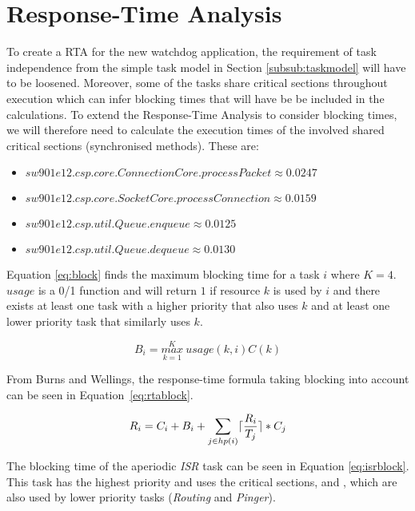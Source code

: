 \section{Response-Time Analysis}
To create a RTA for the new watchdog application, the requirement of task independence from the simple task model in Section \ref{subsub:taskmodel} will have to be loosened. Moreover, some of the tasks share critical sections throughout execution which can infer blocking times that will have be be included in the calculations. To extend the Response-Time Analysis to consider blocking times, we will therefore need to calculate the execution times of the involved shared critical sections (synchronised methods). These are:

\begin{itemize}
	\item $ sw901e12.csp.core.ConnectionCore.processPacket \approx 0.0247$
	\item $ sw901e12.csp.core.SocketCore.processConnection \approx 0.0159$
	\item $ sw901e12.csp.util.Queue.enqueue \approx 0.0125$
	\item $ sw901e12.csp.util.Queue.dequeue \approx 0.0130$
\end{itemize}

Equation \ref{eq:block} finds the maximum blocking time for a task $i$ where $K=4$. $usage$ is a 0/1 function and will return $1$ if resource $k$ is used by $i$ and there exists at least one task with a higher priority that also uses $k$ and at least one lower priority task that similarly uses $k$.

\begin{equation}
\label{eq:block}
     B_{i} = \overset{K}{\underset{k=1}{max}}\ usage(k, i)C(k)
\end{equation}

From Burns and Wellings, the response-time formula taking blocking into account can be seen in Equation~\ref{eq:rtablock}.

\begin{equation}
\label{eq:rtablock}
     R_{i} = C_{i} + B_{i} + \sum\limits_{j\in hp(i)} \lceil\frac{R_{i}}{T_{j}}\rceil*C_{j}
\end{equation}

The blocking time of the aperiodic \textit{ISR} task can be seen in Equation \ref{eq:isrblock}. This task has the highest priority and uses the critical sections,  and , which are also used by lower priority tasks (\textit{Routing} and \textit{Pinger}).

